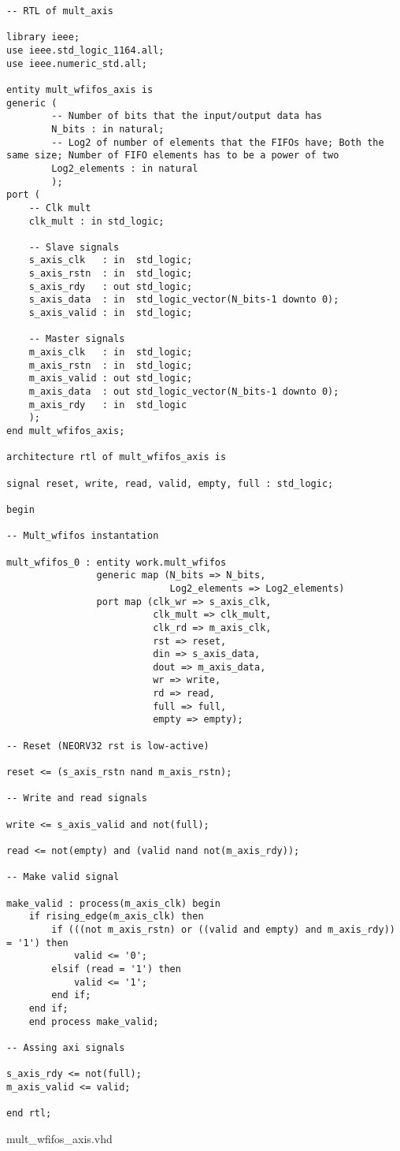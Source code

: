 \begin{code}
\begin{verbatim}
-- RTL of mult_axis

library ieee;
use ieee.std_logic_1164.all;
use ieee.numeric_std.all;

entity mult_wfifos_axis is
generic (
        -- Number of bits that the input/output data has
        N_bits : in natural;
        -- Log2 of number of elements that the FIFOs have; Both the same size; Number of FIFO elements has to be a power of two
        Log2_elements : in natural
        );
port (
    -- Clk mult
    clk_mult : in std_logic;

    -- Slave signals
    s_axis_clk   : in  std_logic;
    s_axis_rstn  : in  std_logic;
    s_axis_rdy   : out std_logic;
    s_axis_data  : in  std_logic_vector(N_bits-1 downto 0);
    s_axis_valid : in  std_logic;

    -- Master signals
    m_axis_clk   : in  std_logic;
    m_axis_rstn  : in  std_logic;
    m_axis_valid : out std_logic;
    m_axis_data  : out std_logic_vector(N_bits-1 downto 0);
    m_axis_rdy   : in  std_logic
    );
end mult_wfifos_axis;

architecture rtl of mult_wfifos_axis is

signal reset, write, read, valid, empty, full : std_logic;

begin

-- Mult_wfifos instantation

mult_wfifos_0 : entity work.mult_wfifos
                generic map (N_bits => N_bits,
                             Log2_elements => Log2_elements)
                port map (clk_wr => s_axis_clk,
                          clk_mult => clk_mult,
                          clk_rd => m_axis_clk,
                          rst => reset,
                          din => s_axis_data,
                          dout => m_axis_data,
                          wr => write,
                          rd => read,
                          full => full,
                          empty => empty);

-- Reset (NEORV32 rst is low-active)

reset <= (s_axis_rstn nand m_axis_rstn);

-- Write and read signals

write <= s_axis_valid and not(full);

read <= not(empty) and (valid nand not(m_axis_rdy));

-- Make valid signal

make_valid : process(m_axis_clk) begin
    if rising_edge(m_axis_clk) then
        if (((not m_axis_rstn) or ((valid and empty) and m_axis_rdy)) = '1') then
            valid <= '0';
        elsif (read = '1') then
            valid <= '1';
        end if;
    end if;
    end process make_valid;

-- Assing axi signals

s_axis_rdy <= not(full);
m_axis_valid <= valid;

end rtl;
\end{verbatim}
\caption{mult\_wfifos\_axis.vhd}
\label{ap-cod:4}
\end{code}

